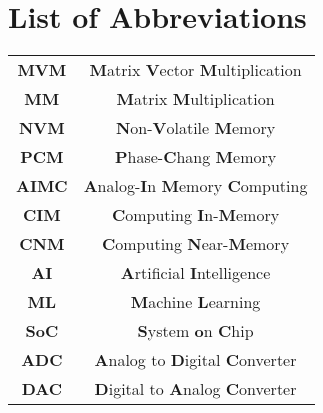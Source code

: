 \chapter*{List of Abbreviations}\label{chap:LOA}

\begin{center}
    
\begingroup
\setlength{\tabcolsep}{10pt} 
\renewcommand{\arraystretch}{1.5} 
\begin{tabular}{ c c }
\textbf{MVM} & \textbf{M}atrix \textbf{V}ector \textbf{M}ultiplication \\
\textbf{MM} & \textbf{M}atrix \textbf{M}ultiplication\\
\textbf{NVM} & \textbf{N}on-\textbf{V}olatile \textbf{M}emory\\
\textbf{PCM} & \textbf{P}hase-\textbf{C}hang \textbf{M}emory\\
\textbf{AIMC} & \textbf{A}nalog-\textbf{I}n \textbf{M}emory \textbf{C}omputing\\
\textbf{CIM} & \textbf{C}omputing \textbf{I}n-\textbf{M}emory\\
\textbf{CNM} & \textbf{C}omputing \textbf{N}ear-\textbf{M}emory\\
\textbf{AI} & \textbf{A}rtificial \textbf{I}ntelligence\\
\textbf{ML} & \textbf{M}achine \textbf{L}earning\\
\textbf{SoC} & \textbf{S}ystem \textbf{o}n \textbf{C}hip\\
\textbf{ADC} & \textbf{A}nalog to \textbf{D}igital \textbf{C}onverter\\
\textbf{DAC} & \textbf{D}igital to \textbf{A}nalog \textbf{C}onverter\\


\end{tabular}
\endgroup
\end{center}
